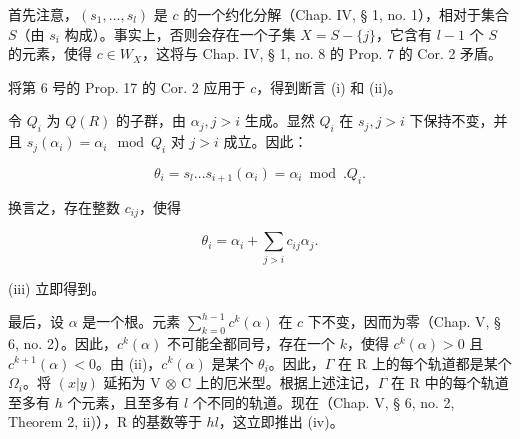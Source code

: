 首先注意，\((s_1, \ldots, s_l)\) 是 \(c\) 的一个约化分解（Chap. IV, § 1, no. 1），相对于集合 \(S\)（由 \(s_i\) 构成）。事实上，否则会存在一个子集 \(X = S - \{j\}\)，它含有 \(l - 1\) 个 \(S\) 的元素，使得 \(c \in W_X\)，这将与 Chap. IV, § 1, no. 8 的 Prop. 7 的 Cor. 2 矛盾。

将第 6 号的 Prop. 17 的 Cor. 2 应用于 \(c\)，得到断言 (i) 和 (ii)。

令 \(Q_{i}\) 为 \(Q(R)\) 的子群，由 \(\alpha_{j}, j > i\) 生成。显然 \(Q_{i}\) 在 \(s_{j}, j > i\) 下保持不变，并且 \(s_{j}(\alpha_{i}) = \alpha_{i} \mod Q_{i}\) 对 \(j > i\) 成立。因此：

\[
\theta_ {i} = s _ {l} \dots s _ {i + 1} (\alpha_ {i}) = \alpha_ {i} \bmod . Q _ {i}.
\]

换言之，存在整数 \(c_{ij}\)，使得

\[
\theta_ {i} = \alpha_ {i} + \sum_ {j > i} c _ {i j} \alpha_ {j}.
\]

(iii) 立即得到。

最后，设 \(\alpha\) 是一个根。元素 \(\sum_{k=0}^{h-1} c^k(\alpha)\) 在 \(c\) 下不变，因而为零（Chap. V, § 6, no. 2）。因此，\(c^k(\alpha)\) 不可能全都同号，存在一个 \(k\)，使得 \(c^k(\alpha) > 0\) 且 \(c^{k+1}(\alpha) < 0\)。由 (ii)，\(c^k(\alpha)\) 是某个 \(\theta_i\)。因此，\(\Gamma\) 在 R 上的每个轨道都是某个 \(\Omega_i\)。将 \((x|y)\) 延拓为 V \(\otimes\) C 上的厄米型。根据上述注记，\(\Gamma\) 在 R 中的每个轨道至多有 \(h\) 个元素，且至多有 \(l\) 个不同的轨道。现在（Chap. V, § 6, no. 2, Theorem 2, ii)），R 的基数等于 \(hl\)，这立即推出 (iv)。
\relax{}
